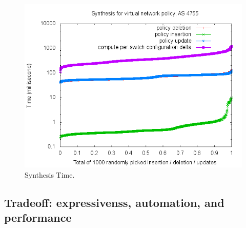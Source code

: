 \begin{figure}
  \centering
  \includegraphics[width=1\linewidth]{figures/vn_synthesis_cdf1000.png}
  \caption{Synthesis Time.}
  \label{fig:init}
\end{figure}

\subsection{Tradeoff: expressivenss, automation, and performance}


% 

